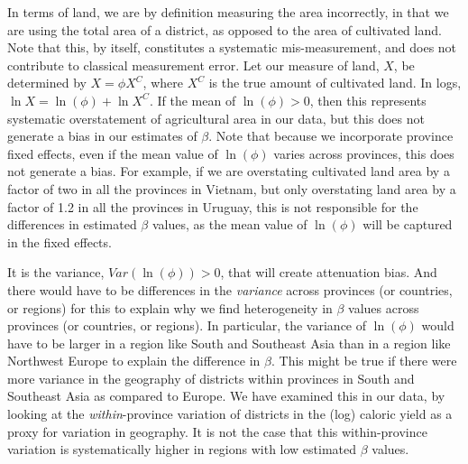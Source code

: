 \documentclass[11pt]{article}
\begin{document}
In terms of land, we are by definition measuring the area incorrectly, in that we are using the total area of a district, as opposed to the area of cultivated land. Note that this, by itself, constitutes a systematic mis-measurement, and does not contribute to classical measurement error. Let our measure of land, $X$, be determined by $X = \phi X^{C}$, where $X^{C}$ is the true amount of cultivated land. In logs, $\ln{X} = \ln(\phi) + \ln X^{C}$. If the mean of $\ln(\phi)>0$, then this represents systematic overstatement of agricultural area in our data, but this does not generate a bias in our estimates of $\beta$. Note that because we incorporate province fixed effects, even if the mean value of $\ln(\phi)$ varies across provinces, this does not generate a bias. For example, if we are overstating cultivated land area by a factor of two in all the provinces in Vietnam, but only overstating land area by a factor of 1.2 in all the provinces in Uruguay, this is not responsible for the differences in estimated $\beta$ values, as the mean value of $\ln(\phi)$ will be captured in the fixed effects.

It is the variance, $Var(\ln(\phi))>0$, that will create attenuation bias. And there would have to be differences in the \textit{variance} across provinces (or countries, or regions) for this to explain why we find heterogeneity in $\beta$ values across provinces (or countries, or regions). In particular, the variance of $\ln(\phi)$ would have to be larger in a region like South and Southeast Asia than in a region like Northwest Europe to explain the difference in $\beta$. This might be true if there were more variance in the geography of districts within provinces in South and Southeast Asia as compared to Europe. We have examined this in our data, by looking at the \textit{within}-province variation of districts in the (log) caloric yield as a proxy for variation in geography. It is not the case that this within-province variation is systematically higher in regions with low estimated $\beta$ values.
\end{document}
